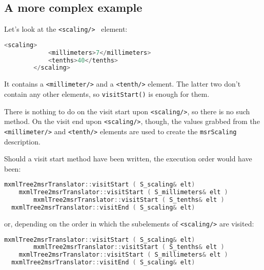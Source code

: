 \subsection{A more complex example}

Let's look at the {\tt <scaling/>} \mxml\ element:
\begin{lstlisting}[language=C++]
		<scaling>
			<millimeters>7</millimeters>
			<tenths>40</tenths>
		</scaling>
\end{lstlisting}

It contains a {\tt <millimeter/>} and a {\tt <tenth/>} element. The latter two don't contain any other elements, so {\tt visitStart()} is enough for them.

There is nothing to do on the visit start upon {\tt <scaling/>}, so there is no such method.
On the visit end upon {\tt <scaling/>}, though, the values grabbed from the {\tt <millimeter/>} and {\tt <tenth/>} elements are used to create the {\tt msrScaling} description.

Should a visit start method have been written, the execution order would have been:
\begin{lstlisting}[language=C++]
  mxmlTree2msrTranslator::visitStart ( S_scaling& elt)
  	mxmlTree2msrTranslator::visitStart ( S_millimeters& elt )
		mxmlTree2msrTranslator::visitStart ( S_tenths& elt )
  mxmlTree2msrTranslator::visitEnd ( S_scaling& elt)
\end{lstlisting}

or, depending on the order in which the subelements of {\tt <scaling/>} are visited:
\begin{lstlisting}[language=C++]
  mxmlTree2msrTranslator::visitStart ( S_scaling& elt)
		mxmlTree2msrTranslator::visitStart ( S_tenths& elt )
  	mxmlTree2msrTranslator::visitStart ( S_millimeters& elt )
  mxmlTree2msrTranslator::visitEnd ( S_scaling& elt)
\end{lstlisting}

